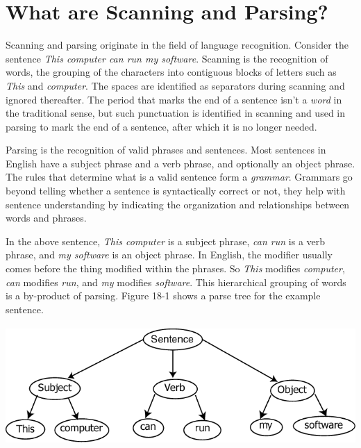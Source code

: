 \section{What are Scanning and Parsing?}

Scanning and parsing originate in the field of language recognition.
Consider the sentence \textit{This computer can run my software}.
Scanning is the recognition of words, the grouping of the characters
into contiguous blocks of letters such as \textit{This} and
\textit{computer}.  The spaces are identified as separators
during scanning and ignored thereafter. The period that marks the end
of a sentence isn't a {\em word\/} in the traditional sense, but
such punctuation is identified in scanning and used in parsing to
mark the end of a sentence, after which it is no longer needed.

Parsing is the recognition of valid phrases and sentences. Most
sentences in English have a subject phrase and a verb phrase, and
optionally an object phrase. The rules that determine what is a valid
sentence form a {\em grammar\/}. Grammars go beyond telling whether
a sentence is syntactically correct or not, they help with sentence
understanding by indicating the organization and relationships between
words and phrases.

In the above sentence, \textit{This computer} is a
subject phrase, \textit{can run} is a verb phrase, and \textit{my
software} is an object phrase. In English, the modifier usually
comes before the 
thing modified within the phrases. So \textit{This} modifies
\textit{computer}, \textit{can} modifies \textit{run}, and \textit{my}
modifies \textit{software}. This hierarchical grouping of words is a
by-product of parsing. Figure 18-1 shows a parse tree for
the example sentence.


\bigskip

\begin{center}
\includegraphics[width=5.4362in,height=1.7846in]{ub-img/ub-img64.png}
\end{center}

